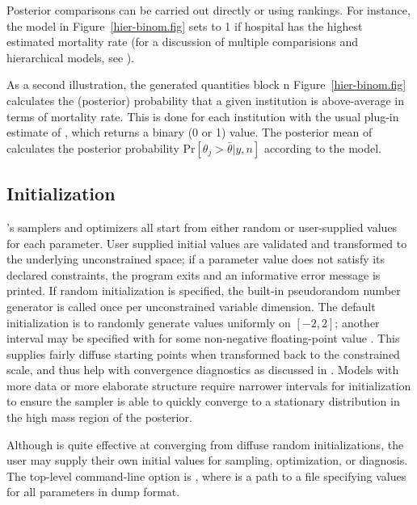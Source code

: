 \documentclass[article]{jss}
\begin{document}
Posterior comparisons can be carried out directly or using rankings.
For instance, the model in Figure~\ref{hier-binom.fig} sets
 to 1 if hospital  has the highest estimated
mortality rate (for a discussion of multiple comparisions and
hierarchical models, see \citep{GelmanEtAl:2012, Efron:2010}).

As a second illustration, the generated quantities block n
Figure~\ref{hier-binom.fig} calculates the (posterior) probability
that a given institution is above-average in terms of mortality rate.
This is done for each institution  with the usual plug-in
estimate of , which returns a binary (0
or 1) value.  The posterior mean of  calculates
the posterior probability $\mbox{Pr}[\theta_j > \bar{\theta}|y,n]$
according to the model.

\subsection{Initialization}

's samplers and optimizers all start from either random
or user-supplied values for each parameter.  User supplied initial
values are validated and transformed to the underlying unconstrained
space; if a parameter value does not satisfy its declared constraints,
the program exits and an informative error message is printed.  If
random initialization is specified, the built-in pseudorandom number
generator is called once per unconstrained variable dimension.  The
default initialization is to randomly generate values uniformly on
$[-2,2]$; another interval may be specified with  for
some non-negative floating-point value .  This supplies fairly
diffuse starting points when transformed back to the constrained
scale, and thus help with convergence diagnostics as discussed in
\citep{GelmanEtAl:2013}.  Models with more data or more elaborate
structure require narrower intervals for initialization to ensure the
sampler is able to quickly converge to a stationary distribution in
the high mass region of the posterior.

Although  is quite effective at converging from diffuse
random initializations, the user may supply their own initial values
for sampling, optimization, or diagnosis.  The top-level command-line
option is , where  is a path to a file
specifying values for all parameters in  dump format.
\end{document}

